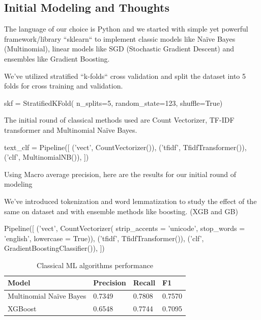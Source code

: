 \documentclass[conference]{IEEEtran}
\begin{document}
\subsection{Initial Modeling and Thoughts}
The language of our choice is Python and we started with simple yet powerful framework/library ``sklearn`` to implement classic models like Naïve Bayes (Multinomial), linear models like SGD (Stochastic Gradient Descent) and ensembles like Gradient Boosting.

We’ve utilized stratified ``k-folds`` cross validation and split the dataset into 5 folds for cross training and validation. 

\begin{verbatimtab}[4]
skf = StratifiedKFold(
	n_splits=5,
	random_state=123,
	shuffle=True)
\end{verbatimtab}

The initial round of classical methods used are Count Vectorizer, TF-IDF transformer and Multinomial Naïve Bayes.

\begin{verbatimtab}[4]
text_clf = Pipeline([
    ('vect', CountVectorizer()),
    ('tfidf', TfidfTransformer()),
    ('clf', MultinomialNB()),
])
\end{verbatimtab}

Using Macro average precision, here are the results for our initial round of modeling

We’ve introduced tokenization and word lemmatization to study the effect of the same on dataset and with ensemble methods like boosting. (XGB and GB)

\begin{verbatimtab}[4]
Pipeline([
    ('vect', CountVectorizer(
    	strip_accents = 'unicode',
         stop_words = 'english',
         lowercase = True)),
    ('tfidf', TfidfTransformer()),
    ('clf', GradientBoostingClassifier()),
])
\end{verbatimtab}

\begin{table}[htbp]
	\caption{Classical ML algorithms performance}
	\begin{center}
		\begin{tabular}{|l|l|l|l|}
			\hline
			\textbf{Model} & \textbf{Precision} & \textbf{Recall} & \textbf{F1}\\ \hline
			Multinomial Naïve Bayes & 0.7349 & 0.7808 & 0.7570 \\ \hline
			XGBoost & 0.6548 & 0.7744 & 0.7095 \\ \hline
		\end{tabular}
		\label{tab2}
	\end{center}
\end{table}
\end{document}
